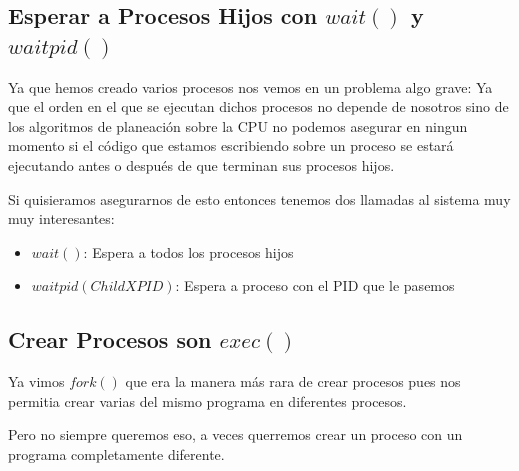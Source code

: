 \documentclass[12pt, fleqn]{report}                             %
\newcommand \Quote {\qq}                                        %
\begin{document}
            \clearpage
            \subsection{Esperar a Procesos Hijos con $wait()$ y $waitpid()$}

                Ya que hemos creado varios procesos nos vemos en un problema algo grave:
                Ya que el orden en el que se ejecutan dichos procesos no depende de 
                nosotros sino de los algoritmos de planeación sobre la CPU no podemos
                asegurar en ningun momento si el código que estamos escribiendo sobre
                un proceso se estará ejecutando antes o después de que terminan sus 
                procesos hijos.

                Si quisieramos asegurarnos de esto entonces tenemos dos llamadas al
                sistema muy muy interesantes:

                \begin{itemize}
                    \item $wait()$: Espera a todos los procesos hijos
                    \item $waitpid(ChildXPID)$: Espera a proceso con
                        el PID que le pasemos
                \end{itemize}


            \clearpage
            \subsection{Crear Procesos son $exec()$}

                Ya vimos $fork()$ que era la manera más rara de crear procesos
                pues nos permitia crear varias \Quote{copias} del mismo programa
                en diferentes procesos.

                Pero no siempre queremos eso, a veces querremos crear un proceso
                con un programa completamente diferente. 

\end{document}
